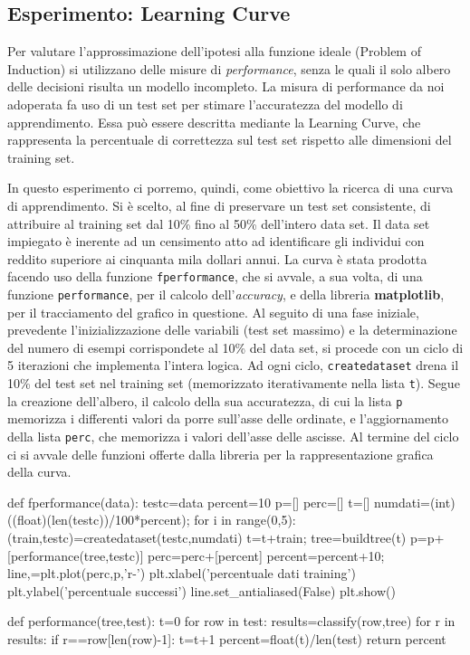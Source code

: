		\subsection{Esperimento: Learning Curve}
			Per valutare l'approssimazione dell'ipotesi alla funzione ideale (\textsf{Problem of Induction}) si utilizzano delle misure di \emph{performance}, senza le quali il solo albero delle decisioni risulta un modello incompleto. La misura di performance da noi adoperata fa uso di un test set per stimare l'accuratezza del modello di apprendimento. Essa può essere descritta mediante la \textsf{Learning Curve}, che rappresenta la percentuale di correttezza sul test set rispetto alle dimensioni del training set.\par
			In questo esperimento ci porremo, quindi, come obiettivo la ricerca di una curva di apprendimento. Si è scelto, al fine di preservare un test set consistente, di attribuire al training set dal 10\% fino al 50\% dell'intero data set.
			Il data set impiegato è inerente ad un censimento atto ad identificare gli individui con reddito superiore ai cinquanta mila dollari annui. La curva è stata prodotta facendo uso della funzione \texttt{fperformance}, che si avvale, a sua volta, di una funzione \texttt{performance}, per il calcolo dell'\emph{accuracy}, e della libreria \textbf{matplotlib}, per il tracciamento del grafico in questione. Al seguito di una fase iniziale, prevedente l'inizializzazione delle variabili (test set massimo) e la determinazione del numero di esempi corrispondete al 10\% del data set, si procede con un ciclo di 5 iterazioni che implementa l'intera logica. Ad ogni ciclo, \texttt{createdataset} drena il 10\% del test set nel training set (memorizzato iterativamente nella lista \texttt{t}). Segue la creazione dell'albero, il calcolo della sua accuratezza, di cui la lista \texttt{p} memorizza i differenti valori da porre sull'asse delle ordinate, e l'aggiornamento della lista \texttt{perc}, che memorizza i valori dell'asse delle ascisse. Al termine del ciclo ci si avvale delle funzioni offerte dalla libreria per la rappresentazione grafica della curva.
			\bigskip
			\begin{python}
		def fperformance(data):
			testc=data
			percent=10
			p=[]
			perc=[]
			t=[]
			numdati=(int)((float)(len(testc))/100*percent);
			for i in range(0,5):
				(train,testc)=createdataset(testc,numdati)
				t=t+train;
				tree=buildtree(t)
				p=p+[performance(tree,testc)]
				perc=perc+[percent]
				percent=percent+10;
			line,=plt.plot(perc,p,'r-')
			plt.xlabel('percentuale dati training')
			plt.ylabel('percentuale successi')
			line.set_antialiased(False)
			plt.show()
			
			
		def performance(tree,test):
			t=0
			for row in test:
				results=classify(row,tree)
				for r in results:
					if r==row[len(row)-1]:
						t=t+1
			percent=float(t)/len(test)
			return percent
			\end{python}
			\bigskip
		
